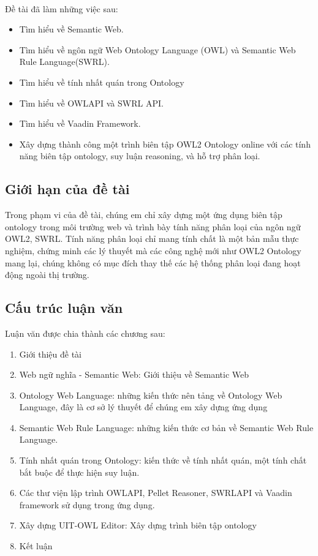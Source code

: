 \\
Đề tài đã làm những việc sau:
\begin{itemize}
\item Tìm hiểu về Semantic Web.
\item Tìm hiểu về ngôn ngữ Web Ontology Language (OWL) và Semantic Web Rule Language(SWRL).
\item Tìm hiểu về tính nhất quán trong Ontology
\item Tìm hiểu về OWLAPI và SWRL API.
\item Tìm hiểu về Vaadin Framework.
\item Xây dựng thành công một trình biên tập OWL2 Ontology online với các tính năng biên tập ontology, suy luận reasoning, và hỗ trợ phân loại.
\end{itemize}
\subsection{Giới hạn của đề tài}
Trong phạm vi của đề tài, chúng em chỉ xây dựng một ứng dụng biên tập ontology trong môi trường web và trình bày tính năng phân loại của ngôn ngữ OWL2, SWRL. Tính năng phân loại chỉ mang tính chất là một bản mẫu thực nghiệm, chứng minh các lý thuyết mà các công nghệ mới như OWL2 Ontology mang lại, chúng không có mục đích thay thế các hệ thống phân loại đang hoạt động ngoài thị trường.
\subsection{Cấu trúc luận văn}
Luận văn được chia thành các chương sau:
\begin{enumerate}
\item Giới thiệu đề tài
\item Web ngữ nghĩa - Semantic Web: Giới thiệu về Semantic Web
\item Ontology Web Language: những kiến thức nên tảng về Ontology Web Language, đây là cơ sở lý thuyết để chúng em xây dựng ứng dụng
\item Semantic Web Rule Language: những kiến thức cơ bản về Semantic Web Rule Language.
\item Tính nhất quán trong Ontology: kiến thức về tính nhất quán, một tính chất bắt buộc để thực hiện suy luận.
\item Các thư viện lập trình OWLAPI, Pellet Reasoner, SWRLAPI và Vaadin framework sử dụng trong ứng dụng.
\item Xây dựng UIT-OWL Editor: Xây dựng trình biên tập ontology
\item Kết luận 
\end{enumerate}
